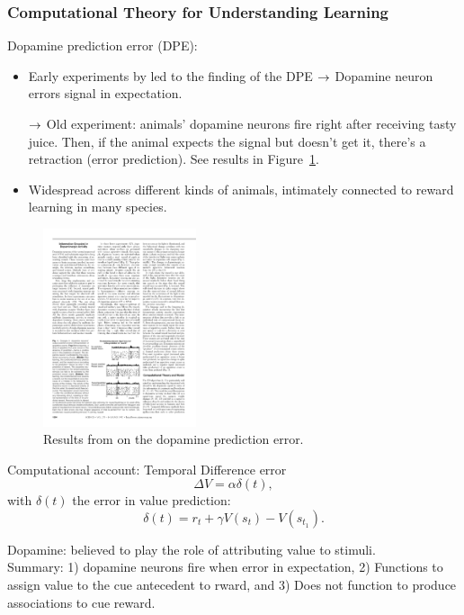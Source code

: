 \subsubsection{Computational Theory for Understanding Learning}

Dopamine prediction error (DPE):
\begin{itemize}
    \item Early experiments by \citet{schultz1997neural} led to the finding of the DPE
    $\rightarrow$ Dopamine neuron errors signal in expectation.
    
    $\rightarrow$ Old experiment: animals' dopamine neurons fire right after receiving tasty juice. Then, if the animal expects the signal but doesn't get it, there's a retraction (error prediction). See results in Figure~\ref{fig:dopamine}.
    
    \item Widespread across different kinds of animals, intimately connected to reward learning in many species.
\end{itemize}

\begin{figure}[h!]
    \centering
    \includegraphics[width=0.4\textwidth]{images/dopamine.pdf}
    \caption{Results from \citet{scheessele18frame} on the dopamine prediction error.}
    \label{fig:dopamine}
\end{figure}


Computational account: Temporal Difference error
\[
\Delta V = \alpha \delta(t),
\]
with $\delta(t)$ the error in value prediction:
\[
\delta(t) = r_t + \gamma V(s_t) - V(s_{t_1}).
\]

Dopamine: believed to play the role of attributing value to stimuli. \\

Summary: 1) dopamine neurons fire when error in expectation, 2) Functions to assign value to the cue antecedent to rward, and 3) Does not function to produce associations to cue reward. \\


